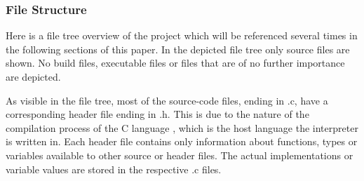 \documentclass[12pt,a4paper]{article}
\newcommand{\cte}[1] {
    \cite{#1}
}
\begin{document}
\subsubsection{File Structure}
Here is a file tree overview of the project which will be referenced
several times in the following sections of this paper. In the depicted file tree
only source files are shown. No build files, executable files or files that
are of no further importance are depicted.
\begin{flushleft}
    \scriptsize\singlespacing\setlength{\DTbaselineskip}{9pt}
\end{flushleft}

As visible in the file tree, most of the source-code files, ending in .c,
have a corresponding header file ending in .h. This is due to the nature
of the compilation process of the C language\cte{c_compilation}, which is the host language
the \name interpreter is written in.
Each header file contains only information about functions, types or variables
available to other source or header files. The actual implementations or 
variable values are stored in the respective .c files.
\end{document}
